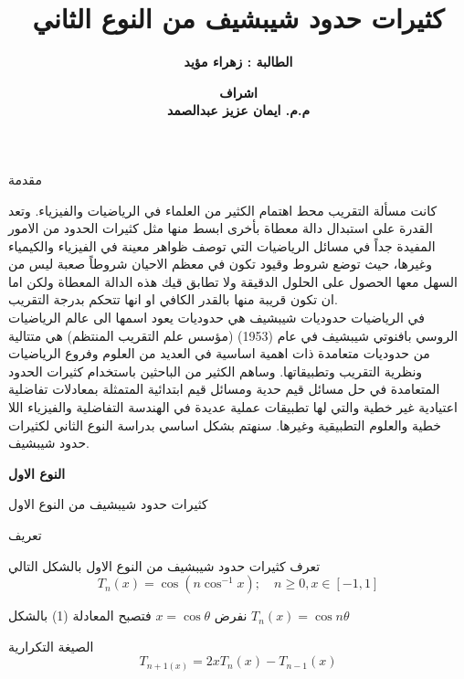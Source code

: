 


	\author{\textbf{الطالبة : زهراء مؤيد}}
	\title{\textbf{كثيرات حدود شيبشيف من النوع الثاني}}
	\date{\textbf{اشراف\\
		م.م. ايمان عزيز عبدالصمد}}
	
	\begin{frame}
		\maketitle
	\end{frame}
	
	\timesfont
	\begin{frame}{مقدمة}
		
		\pause
		كانت مسألة التقريب محط اهتمام الكثير من العلماء في الرياضيات والفيزياء. وتعد القدرة على استبدال دالة معطاة بأخرى ابسط منها مثل كثيرات الحدود من الامور المفيدة جداً في مسائل الرياضيات التي توصف ظواهر معينة في الفيزياء والكيمياء وغيرها، حيث توضع شروط وقيود تكون في معظم الاحيان شروطاً صعبة ليس من السهل معها الحصول على الحلول الدقيقة ولا تطابق قيك هذه الدالة المعطاة ولكن اما ان تكون قريبة منها بالقدر الكافي او انها تتحكم بدرجة التقريب. \\[5pt]
		\pause
		في الرياضيات حدوديات شيبشيف هي حدوديات يعود اسمها الى عالم الرياضيات الروسي بافنوتي شيبشيف في عام (1953) (مؤسس علم التقريب المنتظم) هي متتالية من حدوديات متعامدة ذات اهمية اساسية في العديد من العلوم وفروع الرياضيات ونظرية التقريب وتطبيقاتها. وساهم الكثير من الباحثين باستخدام كثيرات الحدود المتعامدة في حل مسائل قيم حدية ومسائل قيم ابتدائية المتمثلة بمعادلات تفاضلية اعتيادية غير خطية والتي لها تطبيقات عملية عديدة في الهندسة التفاضلية والفيزياء اللا خطية والعلوم التطبيقية وغيرها. سنهتم بشكل اساسي بدراسة النوع الثاني لكثيرات حدود شيبشيف.  
	\end{frame}
	
		\begin{frame}
		\begin{center}
			\Huge
			\textbf{النوع الاول}
		\end{center}
	\end{frame}
	
	\begin{frame}{كثيرات حدود شيبشيف من  النوع الاول}
		\pause
		\begin{exampleblock}{ تعريف}
			
			تعرف كثيرات حدود شيبشيف من النوع الاول بالشكل التالي
			\begin{equation}
				T_n(x) = \cos(n\cos^{-1}x);\quad n\geq 0 , x\in [-1,1]
			\end{equation}
			
			\pause\noindent
			نفرض $x = \cos\theta$ فتصبح المعادلة (1) بالشكل $T_n(x) = \cos n\theta$
		\end{exampleblock}
		
		\pause
		\begin{exampleblock}{ الصيغة التكرارية}
				$$T_{n+1(x)} = 2xT_n(x) - T_{n-1}(x)$$ 
		\end{exampleblock}
	\end{frame}
	
